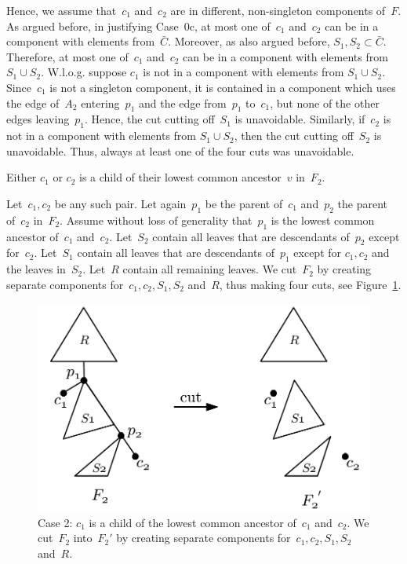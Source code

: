 Hence, we assume that~$c_1$ and~$c_2$ are in different, non-singleton components of~$F$. As argued before, in justifying Case~0c, at most one of~$c_1$ and~$c_2$ can be in a component with elements from~$\bar{C}$. Moreover, as also argued before, $S_1,S_2\subset \bar{C}$. Therefore, at most one of~$c_1$ and~$c_2$ can be in a component with elements from $S_1\cup S_2$. W.l.o.g. suppose $c_1$ is not in a component with elements from $S_1\cup S_2$. Since~$c_1$ is not a singleton component, it is contained in a component which uses the edge of~$A_2$ entering~$p_1$ and the edge from~$p_1$ to~$c_1$, but none of the other edges leaving~$p_1$. Hence, the cut cutting off~$S_1$ is unavoidable. Similarly, if~$c_2$ is not in a component with elements from $S_1\cup S_2$, then the cut cutting off~$S_2$ is unavoidable. Thus, always at least one of the four cuts was unavoidable.

\smallskip

 Either $c_1$ or $c_2$ is a child of their lowest common ancestor~$v$ in~$F_2$. 

Let~$c_1,c_2$ be any such pair. Let again~$p_1$ be the parent of~$c_1$ and~$p_2$ the parent of~$c_2$ in~$F_2$. Assume without loss of generality that~$p_1$ is the lowest common ancestor of~$c_1$ and~$c_2$. Let~$S_2$ contain all leaves that are descendants of~$p_2$ except for~$c_2$. Let~$S_1$ contain all leaves that are descendants of~$p_1$ except for $c_1,c_2$ and the leaves in~$S_2$. Let~$R$ contain all remaining leaves. We cut~$F_2$ by creating separate components for~$c_1,c_2,S_1,S_2$ and~$R$, thus making four cuts, see Figure~\ref{fig:case2}.

\begin{figure}
    \centering
    \includegraphics[scale=.7]{../figs/fig_case2}
    \caption{Case 2: $c_1$ is a child of the lowest common ancestor of~$c_1$ and~$c_2$. We cut~$F_2$ into~$F_2'$ by creating separate components for~$c_1,c_2,S_1,S_2$ and~$R$.
    \label{fig:case2}}
\end{figure}

